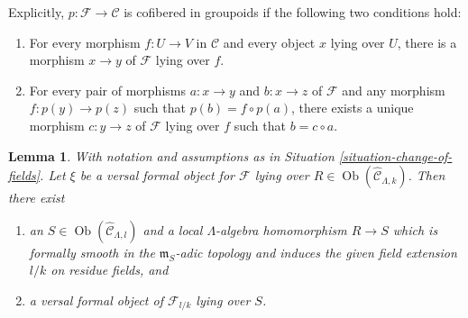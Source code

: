 \documentclass{amsart}
\theoremstyle{plain}
\newtheorem{lemma}[subsection]{Lemma}
\theoremstyle{definition}
\theoremstyle{remark}
\numberwithin{equation}{subsection}
\def\Ob{\mathop{\mathrm{Ob}}\nolimits}
\begin{document}
\noindent
Explicitly, $p: \mathcal{F} \to \mathcal{C}$ is cofibered in groupoids if
the following two conditions hold:
\begin{enumerate}
\item For every morphism $f: U \to V$ in $\mathcal{C}$ and every object
$x$ lying over $U$, there is a morphism $x \to y$ of $\mathcal{F}$ lying
over $f$.
\item For every pair of morphisms $a: x \to y$ and $b: x \to z$
of $\mathcal{F}$ and any morphism $f: p(y) \to p(z)$ such that $p(b) = f
\circ p(a)$, there exists a unique morphism $c: y \to z$ of $\mathcal
F$ lying over $f$ such that $b = c \circ a$.
\end{enumerate}


\begin{lemma}
\label{lemma-change-of-field-versal-ring}
With notation and assumptions as in Situation \ref{situation-change-of-fields}.
Let $\xi$ be a versal formal object for $\mathcal{F}$ lying over
$R \in \Ob(\widehat{\mathcal{C}}_{\Lambda, k})$. Then there exist
\begin{enumerate}
\item an $S \in \Ob(\widehat{\mathcal{C}}_{\Lambda, l})$
and a local $\Lambda$-algebra homomorphism $R \to S$ which is
formally smooth in the $\mathfrak m_S$-adic topology and induces
the given field extension $l/k$ on residue fields, and
\item a versal formal object of $\mathcal{F}_{l/k}$ lying over $S$.
\end{enumerate}
\end{lemma}
\end{document}
